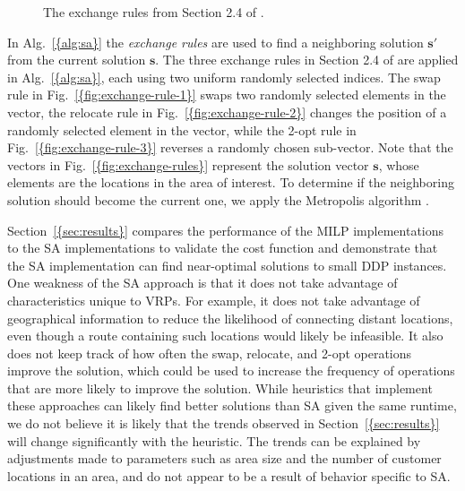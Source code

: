\documentclass[journal]{IEEEtran}
\begin{document}
\begin{figure}[t!]
  \centering
  \hspace{2px}
  \hspace{2px}
  \caption{The exchange rules from Section 2.4 of \cite{Kaku2003}.}
  \label{fig:exchange-rules}
\end{figure}

In {Alg.~\ref{{alg:sa}}} the \emph{exchange rules} are used to find a neighboring solution ${\ensuremath{\mathbf{s}}}'$ from the current solution ${\ensuremath{\mathbf{s}}}$. The three exchange rules in Section 2.4 of \cite{Kaku2003} are applied in {Alg.~\ref{{alg:sa}}}, each using two uniform randomly selected indices. The swap rule in {Fig.~\ref{{fig:exchange-rule-1}}} swaps two randomly selected elements in the vector, the relocate rule in {Fig.~\ref{{fig:exchange-rule-2}}} changes the position of a randomly selected element in the vector, while the 2-opt rule in {Fig.~\ref{{fig:exchange-rule-3}}} reverses a randomly chosen sub-vector. Note that the vectors in {Fig.~\ref{{fig:exchange-rules}}} represent the solution vector ${\ensuremath{\mathbf{s}}}$, whose elements are the locations in the area of interest. To determine if the neighboring solution should become the current one, we apply the Metropolis algorithm \cite{Metropolis1953}.

{Section~\ref{{sec:results}}} compares the performance of the MILP implementations to the SA implementations to validate the cost function and demonstrate that the SA implementation can find near-optimal solutions to small DDP instances. One weakness of the SA approach is that it does not take advantage of characteristics unique to VRPs. For example, it does not take advantage of geographical information to reduce the likelihood of connecting distant locations, even though a route containing such locations would likely be infeasible. It also does not keep track of how often the swap, relocate, and 2-opt operations improve the solution, which could be used to increase the frequency of operations that are more likely to improve the solution. While heuristics that implement these approaches can likely find better solutions than SA given the same runtime, we do not believe it is likely that the trends observed in {Section~\ref{{sec:results}}} will change significantly with the heuristic. The trends can be explained by adjustments made to parameters such as area size and the number of customer locations in an area, and do not appear to be a result of behavior specific to SA.
\end{document}

